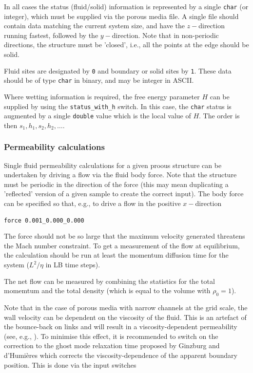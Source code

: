 In all cases the status (fluid/solid) information is represented by a
single \texttt{char} (or integer), which must be supplied via the
porous media file. A single file should contain data matching the
current system size, and have the $z-$direction running fastest,
followed by the $y-$direction. Note that in non-periodic directions,
the structure must be 'closed', i.e., all the points at the edge
should be solid.

Fluid sites are designated by \texttt{0} and boundary or solid sites
by \texttt{1}. These data should be of type \texttt{char} in binary,
and may be integer in ASCII.

Where wetting information is required, the free energy parameter $H$
can be supplied by using the \texttt{status\_with\_h} switch. In this
case, the \texttt{char} status is augmented by a single \texttt{double}
value which is the local value of $H$. The order is then
$s_1,h_1, s_2, h_2, \ldots$.


\subsubsection{Permeability calculations}

Single fluid permeability calculations for a given proous structure
can be undertaken by driving a flow via the fluid body force. Note
that the structure must be periodic in the direction of the force
(this may mean duplicating a 'reflected' version of a given sample
to create the correct input). The body force can be specified so
that, e.g., to drive a flow in the positive $x-$direction

\texttt{force 0.001\_0.000\_0.000}

The force should not be so large that the maximum velocity generated
threatens the Mach number constraint. To get a measurement of the
flow at equilibrium, the calculation should be run at least the
momentum diffusion time for the system ($L^2/\eta$ in LB time steps).

The net flow can be measured by combining the statistics for the
total momemtum and the total density (which is equal to the volume
with $\rho_0 = 1$).

Note that in the case of porous media with narrow channels at the grid
scale, the wall velocity can be dependent on the viscosity of the fluid.
This is an artefact of the bounce-back on links and will result in a
viscosity-dependent permeability (see, e.g., \cite{lipanmiller}). To minimise
this effect, it is recommended to switch on the correction to the ghost
mode relaxation time proposed by Ginzburg and d'Humi\`eres \cite{ginzburg}
which corrects the viscosity-dependence of the apparent boundary
position. This is done via the input switches

